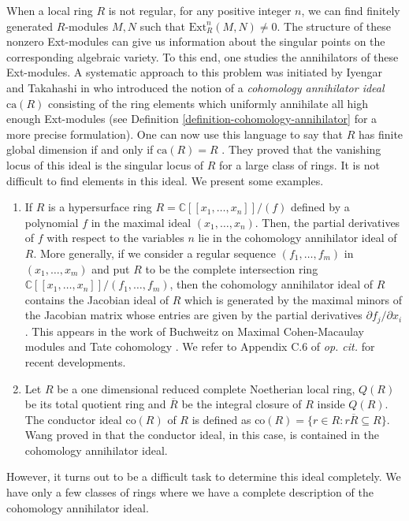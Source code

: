 \documentclass[12pt]{amsart}
\newcommand{\Ext}{\mathrm{Ext}}
\newcommand\ca{\mathrm{ca}}
\newcommand\co{\mathrm{co}}
\newcommand{\CC}{\mathcal{C}}
\theoremstyle{definition}
\numberwithin{equation}{theorem}
\def\CC{\mathbb{C}}
\begin{document}
When a local ring $R$ is not regular, for any positive integer $n$, we can find finitely generated $R$-modules $M,N$ such that $\Ext_R^n(M,N) \neq 0$. The structure of these nonzero Ext-modules can give us information about the singular points on the corresponding algebraic variety. To this end, one studies the annihilators of these Ext-modules. A systematic approach to this problem was initiated by Iyengar and Takahashi in \cite{iyengar-takahashi} who introduced the notion of a  \textit{cohomology annihilator ideal} $\ca(R)$ consisting of the ring elements which uniformly annihilate all high enough Ext-modules (see Definition \ref{definition-cohomology-annihilator} for a more precise formulation). One can now use this language to say that $R$ has finite global dimension if and only if $\ca(R) = R$ \cite[Example 2.5]{iyengar-takahashi}. They proved that the vanishing locus of this ideal is the singular locus of $R$ for a large class of rings. It is not difficult to find elements in this ideal. We present some examples.
\begin{enumerate}
    \item If $R$ is a hypersurface ring $R = \CC[\![x_1, \ldots, x_n]\!]/(f)$ defined by a polynomial $f$ in the maximal ideal $(x_1, \ldots, x_n)$. Then, the partial derivatives of $f$ with respect to the variables $n$ lie in the cohomology annihilator ideal of $R$. More generally, if we consider a regular sequence $(f_1, \ldots, f_m)$ in $(x_1, \ldots, x_m)$ and put $R$ to be the complete intersection ring $\CC[\![x_1, \ldots, x_n]\!]/(f_1, \ldots, f_m)$, then the cohomology annihilator ideal of $R$ contains the Jacobian ideal of $R$ which is generated by the maximal minors of the Jacobian matrix whose entries are given by the partial derivatives $\partial f_j/\partial x_i$. This appears in the work of Buchweitz on Maximal Cohen-Macaulay modules and Tate cohomology \cite[Section 7]{Buchweitz}. We refer to Appendix C.6 of \textit{op. cit.} for recent developments.
    \item Let $R$ be a one dimensional reduced complete Noetherian local ring, $Q(R)$ be its total quotient ring and $\overline{R}$ be the integral closure of $R$ inside $Q(R)$. The conductor ideal $\co(R)$ of $R$ is defined as $\co(R) = \{ r\in R \colon r \overline{R} \subseteq R\} $. Wang proved in \cite{Wang} that the conductor ideal, in this case, is contained in the cohomology annihilator ideal.     
\end{enumerate}
However, it turns out to be a difficult task to determine this ideal completely. We have only a few classes of rings where we have a complete description of the cohomology annihilator ideal.
\end{document}
